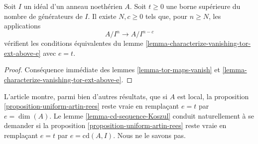 \begin{proposition}
\label{proposition-uniform-artin-rees}
Soit $I$ un idéal d'un anneau noethérien $A$. Soit $t \geq 0$ une borne supérieure du nombre de générateurs de $I$. Il existe $N, c \geq 0$ tels que, pour $n \geq N$, les applications
$$
A/I^n \to A/I^{n - c}
$$
vérifient les conditions équivalentes du lemme \ref{lemma-characterize-vanishing-tor-ext-above-e} avec $e = t$.
\end{proposition}

\begin{proof}
Conséquence immédiate des lemmes \ref{lemma-tor-maps-vanish} et \ref{lemma-characterize-vanishing-tor-ext-above-e}.
\end{proof}

\begin{remark}
\label{remark-better-bound}
L'article \cite{AHS} montre, parmi bien d'autres résultats, que si $A$ est local, la proposition \ref{proposition-uniform-artin-rees} reste vraie en remplaçant $e = t$ par $e = \dim(A)$. Le lemme \ref{lemma-cd-sequence-Koszul} conduit naturellement à se demander si la proposition \ref{proposition-uniform-artin-rees} reste vraie en remplaçant $e = t$ par $e = \text{cd}(A, I)$. Nous ne le savons pas.
\end{remark}


